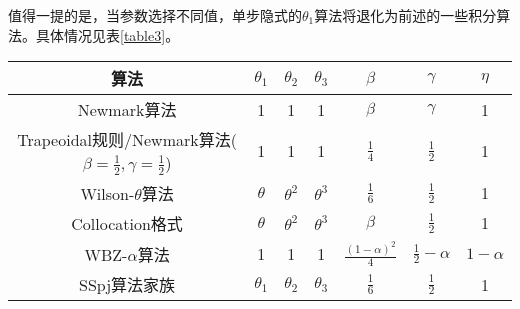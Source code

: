 值得一提的是，当参数选择不同值，单步隐式的$\theta_1$算法将退化为前述的一些积分算法。具体情况见表\ref{table3}。
\begin{table}[htbp]
\vspace{0.5em}\centering\wuhao
\begin{tabular}{ccccccc}
\toprule[1.5pt]
算法 & $\theta_1$ & $\theta_2$ & $\theta_3$ & $\beta$ & $\gamma$ & $\eta$\\
\midrule[1pt]
Newmark算法 & 1 & 1 & 1 & $\beta$ & $\gamma$ & 1\\ [0.5em]
Trapeoidal规则/Newmark算法($\beta=\frac{1}{2},\gamma=\frac12$) & 1 & 1 & 1 & $\frac{1}{4}$ & $\frac12$ & 1\\ [0.5em]
Wilson-$\theta$算法 & $\theta$ & $\theta^2$ & $\theta^3$ & $\frac16$ & $\frac{1}{2}$ & 1 \\ [0.5em]
Collocation格式\cite{Hilber1978} & $\theta$ & $\theta^2$ & $\theta^3$ & $\beta$ & $\frac{1}{2}$ & 1 \\ [0.5em]
WBZ-$\alpha$算法 & 1 & 1 & 1 & $\frac{(1-\alpha)^2}{4}$ & $\frac{1}{2}-\alpha$ & $1-\alpha$ \\ [0.5em]
SSpj算法家族\cite{Zienkiewicz1984a,Wood1984} & $\theta_1$ & $\theta_2$ & $\theta_3$ & $\frac16$ & $\frac{1}{2}$ & 1 \\
\bottomrule[1.5pt]
\end{tabular}
\end{table}

